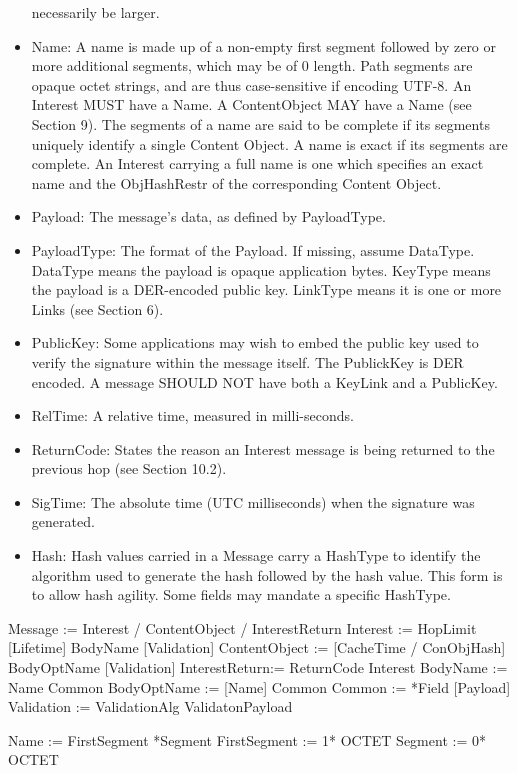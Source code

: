 \documentclass[12pt]{article}
\begin{document}
\begin{itemize}
   necessarily be larger.
\item Name: A name is made up of a non-empty first segment followed by
    zero or more additional segments, which may be of 0 length.  Path
    segments are opaque octet strings, and are thus case-sensitive if
    encoding UTF-8.  An Interest MUST have a Name.  A ContentObject
    MAY have a Name (see Section 9).  The segments of a name are said
    to be complete if its segments uniquely identify a single Content
    Object.  A name is exact if its segments are complete.  An
    Interest carrying a full name is one which specifies an exact name
    and the ObjHashRestr of the corresponding Content Object.
\item Payload: The message's data, as defined by PayloadType.
\item PayloadType: The format of the Payload.  If missing, assume
   DataType.  DataType means the payload is opaque application bytes.
   KeyType means the payload is a DER-encoded public key.  LinkType
   means it is one or more Links (see Section 6).
\item PublicKey: Some applications may wish to embed the public key used
   to verify the signature within the message itself.  The PublickKey
   is DER encoded.  A message SHOULD NOT have both a KeyLink and a
   PublicKey.
\item RelTime: A relative time, measured in milli-seconds.
\item ReturnCode: States the reason an Interest message is being
   returned to the previous hop (see Section 10.2).
\item SigTime: The absolute time (UTC milliseconds) when the signature
   was generated.
\item Hash: Hash values carried in a Message carry a HashType to
   identify the algorithm used to generate the hash followed by the
   hash value.  This form is to allow hash agility.  Some fields may
   mandate a specific HashType.
\end{itemize}

Message       := Interest / ContentObject / InterestReturn
Interest      := HopLimit [Lifetime] BodyName [Validation]
ContentObject := [CacheTime / ConObjHash] BodyOptName [Validation]
InterestReturn:= ReturnCode Interest
BodyName      := Name Common
BodyOptName   := [Name] Common
Common        := *Field [Payload]
Validation    := ValidationAlg ValidatonPayload

Name          := FirstSegment *Segment
FirstSegment  := 1* OCTET
Segment       := 0* OCTET
\end{document}
